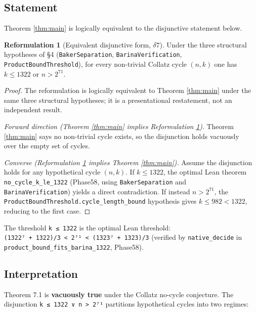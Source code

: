 \documentclass[
  11pt]{amsart}
\theoremstyle{plain}
\theoremstyle{definition}
\newtheorem{reformulation}[theorem]{Reformulation}
\theoremstyle{remark}
\begin{document}
\subsection{Statement}\label{statement-1}

Theorem \ref{thm:main} is logically equivalent to the disjunctive
statement below.

\begin{reformulation}[Equivalent disjunctive form, $\delta 7$]
\label{ref:disjunction}
Under the three structural hypotheses of §4 (\texttt{BakerSeparation},
\texttt{BarinaVerification}, \texttt{ProductBoundThreshold}), for
every non-trivial Collatz cycle $(n, k)$ one has $k \leq 1322$ or
$n > 2^{71}$.
\end{reformulation}

\begin{proof}
The reformulation is logically equivalent to Theorem \ref{thm:main}
under the same three structural hypotheses; it is a presentational
restatement, not an independent result.

\smallskip
\noindent\textit{Forward direction (Theorem \ref{thm:main} implies
Reformulation \ref{ref:disjunction}).} Theorem \ref{thm:main} says
no non-trivial cycle exists, so the disjunction holds vacuously over
the empty set of cycles.

\smallskip
\noindent\textit{Converse (Reformulation \ref{ref:disjunction}
implies Theorem \ref{thm:main}).} Assume the disjunction holds for
any hypothetical cycle $(n, k)$. If $k \leq 1322$, the optimal Lean
theorem \texttt{no\_cycle\_k\_le\_1322} (Phase58, using
\texttt{BakerSeparation} and \texttt{BarinaVerification}) yields a
direct contradiction. If instead $n > 2^{71}$, the
\texttt{ProductBoundThreshold.cycle\_length\_bound} hypothesis gives
$k \leq 982 < 1322$, reducing to the first case.
\end{proof}

The threshold \texttt{k\ ≤\ 1322} is the optimal Lean threshold:
\texttt{(1322⁷\ +\ 1322)/3\ \textless{}\ 2⁷¹\ \textless{}\ (1323⁷\ +\ 1323)/3}
(verified by \texttt{native\_decide} in
\texttt{product\_bound\_fits\_barina\_1322}, Phase58).

\subsection{Interpretation}\label{interpretation}

Theorem 7.1 is \textbf{vacuously true} under the Collatz no-cycle
conjecture. The disjunction
\texttt{k\ ≤\ 1322\ ∨\ n\ \textgreater{}\ 2⁷¹} partitions hypothetical
cycles into two regimes:
\end{document}
